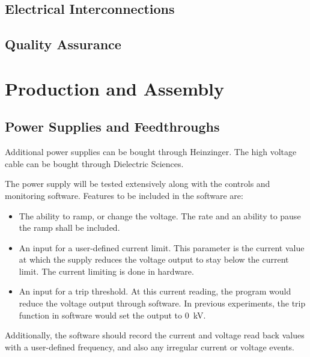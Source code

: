 \subsection{Electrical Interconnections}


\subsection{Quality Assurance}
\label{sec:fddp-hv-qa}



\section{Production and Assembly}
\label{sec:fddp-hv-prod-assy}

\subsection{Power Supplies and Feedthroughs}
\label{sec:fddp-hv-supplies-feedthroughs}

Additional power supplies can be bought through Heinzinger.   The high voltage cable can be bought through Dielectric Sciences.  

The power supply will be tested extensively along with the controls and monitoring software.  Features to be included in the software are:
\begin{itemize}
\item The ability to ramp, or change the voltage.  The rate and an ability to pause the ramp shall be included.
\item An input for a user-defined current limit.  This parameter is the current value at which the supply reduces the voltage output to stay below the current limit.  The current limiting is done in hardware.
\item An input for a trip threshold.  At this current reading, the program would reduce the voltage output through software.  In previous experiments, the trip function in software would set the output to \SI{0}{kV}.
\end{itemize}
\noindent Additionally, the software should record the current and voltage read back values with a user-defined frequency, and also any irregular current or voltage events.

